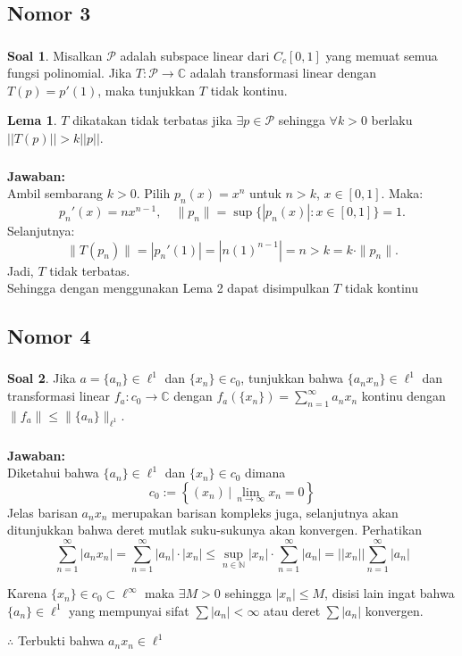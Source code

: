 \documentclass[aspectratio=169]{beamer}
\theoremstyle{definition}
\newtheorem{lema}{Lema}
\newtheorem{soal}{Soal}
\newcommand{\N}{\mathbb{N}}
\begin{document}
\subsection{Nomor 3}
\begin{frame}
  \frametitle{\insertsection}
  \begin{soal}
    Misalkan $\mathcal{P}$ adalah subspace linear dari $C_c[0,1]$ yang memuat semua fungsi polinomial. Jika $T \colon \mathcal{P} \to \mathbb{C}$ adalah transformasi linear dengan $T(p) = p'(1)$, maka tunjukkan $T$ tidak kontinu.  \end{soal}
  \begin{lema}
    $T$ dikatakan tidak terbatas jika $\exists p\in \mathcal{P}$ sehingga $\forall k>0$ berlaku $||T(p)||>k||p||$.
  \end{lema}
\end{frame}
\begin{frame}
  \frametitle{\insertsection}
  \framesubtitle{\insertsubsection}
  \textbf{Jawaban:}\\
  Ambil sembarang $k > 0$. Pilih $p_n(x) = x^n$ untuk $n > k$, $x \in [0,1]$. Maka:
  \[
    p_n'(x) = nx^{n-1}, \quad \|p_n\| = \sup\{|p_n(x)| : x \in [0,1]\} = 1.
  \]
  Selanjutnya:
  \[
    \|T(p_n)\| = |p_n'(1)| = |n(1)^{n-1}| = n > k = k \cdot \|p_n\|.
  \]
  Jadi, $T$ tidak terbatas.\\

  Sehingga dengan menggunakan Lema 2 dapat disimpulkan $T$ tidak kontinu
\end{frame}

\subsection{Nomor 4}
\begin{frame}
  \frametitle{\insertsection}
  \begin{soal}
    Jika $a = \{a_n\} \in \ell^1$ dan $\{x_n\} \in c_0$, tunjukkan bahwa $\{a_n x_n\} \in \ell^1$ dan transformasi linear $f_a \colon c_0 \to \mathbb{C}$ dengan $f_a(\{x_n\}) = \sum_{n=1}^\infty a_n x_n$ kontinu dengan $\|f_a\| \leq \|\{a_n\}\|_{\ell^1}$.
  \end{soal}
\end{frame}

\begin{frame}
  \frametitle{\insertsection}
  \framesubtitle{\insertsubsection}
  \textbf{Jawaban:}\\
  Diketahui bahwa $\{a_n\} \in \ell^1$ dan $\{x_n\} \in c_0$ dimana
  \[c_0:=\left\{(x_n)\,|\,\lim_{n \to \infty} x_n = 0\right\}\]
  Jelas barisan $a_nx_n$ merupakan barisan kompleks juga, selanjutnya akan ditunjukkan bahwa deret mutlak suku-sukunya akan konvergen. Perhatikan
  $$
    \sum_{n=1}^\infty |a_n x_n| = \sum_{n=1}^\infty |a_n|\cdot|x_n| \leq \sup_{n\in\N} |x_n| \cdot \sum_{n=1}^\infty |a_n|=||x_n||\sum_{n=1}^\infty |a_n|
  $$

  Karena $\{x_n\} \in c_0 \subset \ell^\infty$ maka $\exists M > 0$ sehingga $|x_n| \leq M$, disisi lain ingat bahwa $\{a_n\} \in \ell^1$ yang mempunyai sifat $\sum |a_n| < \infty$ atau deret $\sum |a_n|$ konvergen.

  $\therefore$ Terbukti bahwa $a_nx_n\in\ell^1$
\end{frame}
\end{document}
